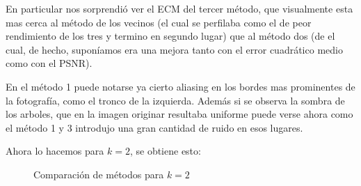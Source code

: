 En particular nos sorprendió ver el ECM del tercer método, que visualmente esta mas cerca al método de los vecinos (el cual se perfilaba como el de peor rendimiento de los tres y termino en segundo lugar) que al método dos (de el cual, de hecho, suponíamos era una mejora tanto con el error cuadrático medio como con el PSNR).

En el método 1 puede notarse ya cierto aliasing en los bordes mas prominentes de la fotografía, como el tronco de la izquierda. Además si se observa la sombra de los arboles, que en la imagen originar resultaba uniforme puede verse ahora como el método 1 y 3 introdujo una gran cantidad de ruido en esos lugares.

Ahora lo hacemos para $k=2$, se obtiene esto:

\begin{figure}[H]
    \centering
    \qquad
    \qquad
    \caption{Comparación de métodos para $k = 2$}
    \label{fig:example}%
\end{figure}


